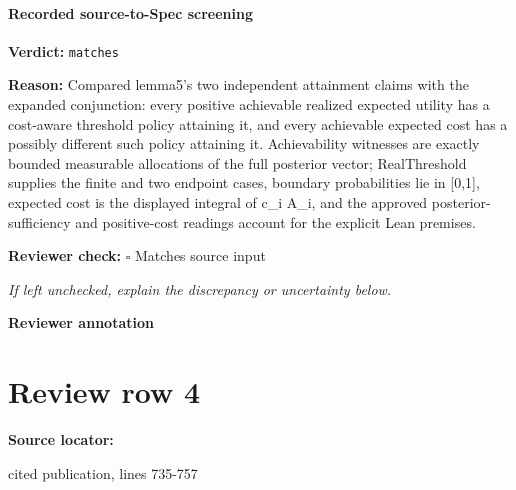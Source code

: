 \documentclass[10pt]{article}
\newcommand{\reviewerbox}{%
  \par\noindent\fbox{\parbox{0.96\linewidth}{\rule{0pt}{0.38in}}}\par
}
\newcommand{\reviewmatch}[1]{%
  \par\noindent\textbf{Reviewer check:} $\square$\; #1\par
  \noindent\emph{If left unchecked, explain the discrepancy or uncertainty below.}\par
}
\begin{document}
\paragraph{Recorded source-to-Spec screening}
\textbf{Verdict:} \texttt{matches}
\\
{\raggedright
\textbf{Reason:} Compared lemma5's two independent attainment claims with the expanded conjunction:\allowbreak{} every positive achievable realized expected utility has a cost-\allowbreak{}aware threshold policy attaining it, and every achievable expected cost has a possibly different such policy attaining it.\allowbreak{} Achievability witnesses are exactly bounded measurable allocations of the full posterior vector;\allowbreak{} RealThreshold supplies the finite and two endpoint cases, boundary probabilities lie in [0,1], expected cost is the displayed integral of c\_\allowbreak{}i A\_\allowbreak{}i, and the approved posterior-\allowbreak{}sufficiency and positive-\allowbreak{}cost readings account for the explicit Lean premises.\allowbreak{}
\par}
\reviewmatch{Matches source input}
\noindent\textbf{Reviewer annotation}\par
\reviewerbox
\clearpage
\hypertarget{source-claim-cd971bcfb0eb8825}{}
\section*{Review row 4}
\textbf{Source locator:} {\footnotesize\raggedright cited publication, lines 735-\allowbreak{}757\par}
\end{document}
